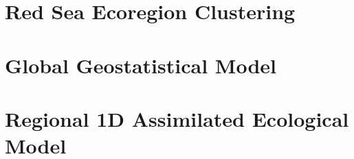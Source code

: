\section{Red Sea Ecoregion Clustering}

\section{Global Geostatistical Model}

\section{Regional 1D Assimilated Ecological Model}

